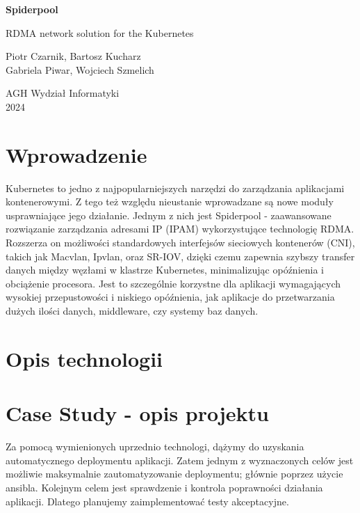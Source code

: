 \documentclass[onecolumn,12pt]{article}
\begin{document}
\begin{titlepage}
\begin{center}
\vspace*{2.5cm}
\Huge
\textbf{Spiderpool}
            
\vspace{0.5cm}
\LARGE
RDMA network solution for the Kubernetes
            
\vspace{1.5cm}

\large
Piotr Czarnik, Bartosz Kucharz
\\Gabriela Piwar, Wojciech Szmelich
              
\vspace{0.8cm}          
\Large
AGH Wydział Informatyki\\
2024    
\end{center}
\end{titlepage}

\tableofcontents
\thispagestyle{empty}
\newpage

\section{Wprowadzenie}
Kubernetes to jedno z najpopularniejszych narzędzi do zarządzania aplikacjami kontenerowymi. 
Z tego też względu nieustanie wprowadzane są nowe moduły usprawniające jego działanie. 
Jednym z nich jest Spiderpool - zaawansowane rozwiązanie zarządzania adresami IP (IPAM) wykorzystujące technologię RDMA.
Rozszerza on możliwości standardowych interfejsów sieciowych kontenerów (CNI), takich jak Macvlan, Ipvlan, oraz SR-IOV, 
dzięki czemu zapewnia  szybszy transfer danych między węzłami w klastrze Kubernetes, minimalizując opóźnienia i obciążenie procesora. 
Jest to szczególnie korzystne dla aplikacji wymagających wysokiej przepustowości i niskiego opóźnienia, 
jak aplikacje do przetwarzania dużych ilości danych, middleware, czy systemy baz danych.

\section{Opis technologii}

\section{Case Study - opis projektu}
Za pomocą wymienionych uprzednio technologi, dążymy do uzyskania automatycznego deploymentu aplikacji. Zatem jednym z wyznaczonych celów jest możliwie maksymalnie zautomatyzowanie deploymentu; głównie poprzez użycie ansibla. \newline 
Kolejnym celem jest sprawdzenie i kontrola poprawności działania aplikacji. Dlatego planujemy zaimplementować testy akceptacyjne. 
\end{document}
